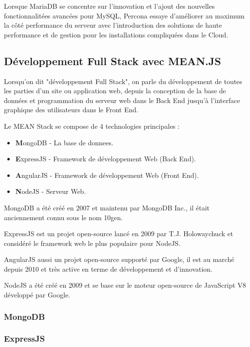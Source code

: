 \documentclass[a4paper,11pt,oneside]{report}
\begin{document}
Lorsque MariaDB se concentre sur l’innovation et l’ajout des nouvelles fonctionnalitées avancées pour MySQL, Percona essaye d’améliorer au maximum la côté performance du serveur avec l’introduction des solutions de haute performance et de gestion pour les installations compliquées dans le Cloud.
\newline

\subsection{Développement Full Stack avec MEAN.JS}

Lorsqu'on dit "développement Full Stack", on parle du développement de toutes les parties d'un site ou application web, depuis la conception de la base de données et programmation du serveur web dans le Back End jusqu'à l'interface graphique des utilisateurs dans le Front End.
\newline

Le MEAN\cite{gettingMEAN} Stack se compose de 4 technologies principales :
\begin{itemize}
\item \textbf{M}ongoDB - La base de donnees.
\item \textbf{E}xpressJS - Framework de développement Web (Back End).
\item \textbf{A}ngularJS - Framework de développement Web (Front End).
\item \textbf{N}odeJS - Serveur Web.
\newline
\end{itemize}


MongoDB a été créé en 2007 et maintenu par MongoDB Inc., il était anciennement connu sous le nom 10gen.

ExpressJS est un projet open-source lancé en 2009 par T.J. Holowaychuck et considéré le framework web le plus populaire pour NodeJS.

AngularJS aussi un projet open-source supporté par Google, il est au marché depuis 2010 et très active en terme de développement et d'innovation.

NodeJS a été créé en 2009 et se base sur le moteur open-source de JavaScript V8 développé par Google.

\subsubsection{MongoDB}

\subsubsection{ExpressJS}
\end{document}
